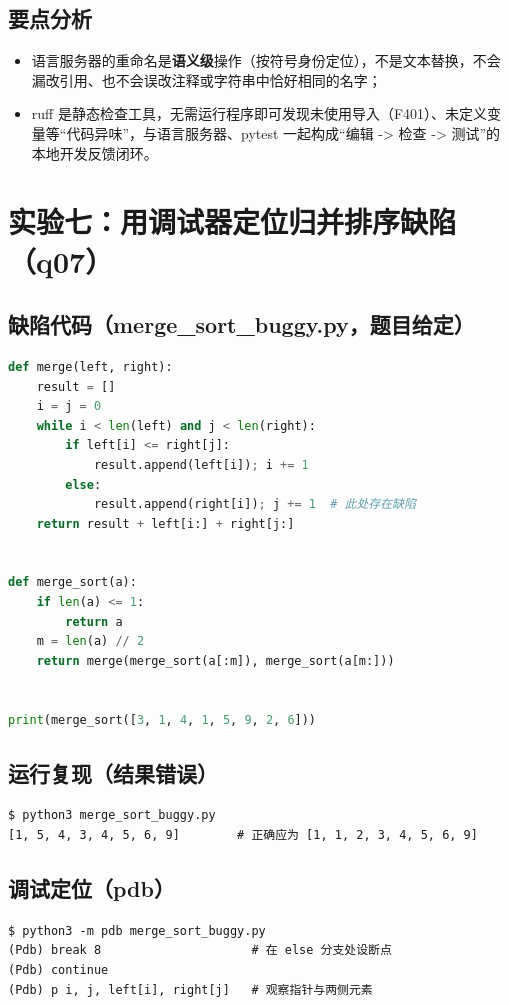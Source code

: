 \documentclass[UTF8,fontset=ubuntu]{ctexart}
\begin{document}
\subsection{要点分析}
\begin{itemize}
\item 语言服务器的重命名是\textbf{语义级}操作（按符号身份定位），不是文本替换，不会漏改引用、也不会误改注释或字符串中恰好相同的名字；
\item ruff 是静态检查工具，无需运行程序即可发现未使用导入（F401）、未定义变量等“代码异味”，与语言服务器、pytest 一起构成“编辑 -> 检查 -> 测试”的本地开发反馈闭环。
\end{itemize}

\section{实验七：用调试器定位归并排序缺陷（q07）}

\subsection{缺陷代码（merge\_sort\_buggy.py，题目给定）}
\begin{lstlisting}[language=Python]
def merge(left, right):
    result = []
    i = j = 0
    while i < len(left) and j < len(right):
        if left[i] <= right[j]:
            result.append(left[i]); i += 1
        else:
            result.append(right[i]); j += 1  # 此处存在缺陷
    return result + left[i:] + right[j:]


def merge_sort(a):
    if len(a) <= 1:
        return a
    m = len(a) // 2
    return merge(merge_sort(a[:m]), merge_sort(a[m:]))


print(merge_sort([3, 1, 4, 1, 5, 9, 2, 6]))
\end{lstlisting}

\subsection{运行复现（结果错误）}
\begin{lstlisting}
$ python3 merge_sort_buggy.py
[1, 5, 4, 3, 4, 5, 6, 9]        # 正确应为 [1, 1, 2, 3, 4, 5, 6, 9]
\end{lstlisting}

\subsection{调试定位（pdb）}
\begin{lstlisting}
$ python3 -m pdb merge_sort_buggy.py
(Pdb) break 8                     # 在 else 分支处设断点
(Pdb) continue
(Pdb) p i, j, left[i], right[j]   # 观察指针与两侧元素
\end{lstlisting}
\end{document}
